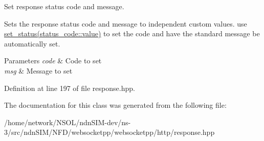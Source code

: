 Set response status code and message. 

Sets the response status code and message to independent custom values. use \hyperlink{classwebsocketpp_1_1http_1_1parser_1_1response_a2576fc301cc6798d5a830298188b4832}{set\+\_\+status(status\+\_\+code\+::value)} to set the code and have the standard message be automatically set.


\begin{DoxyParams}{Parameters}
{\em code} & Code to set \\
\hline
{\em msg} & Message to set \\
\hline
\end{DoxyParams}


Definition at line 197 of file response.\+hpp.



The documentation for this class was generated from the following file\+:\begin{DoxyCompactItemize}
\item 
/home/network/\+N\+S\+O\+L/ndn\+S\+I\+M-\/dev/ns-\/3/src/ndn\+S\+I\+M/\+N\+F\+D/websocketpp/websocketpp/http/response.\+hpp\end{DoxyCompactItemize}
